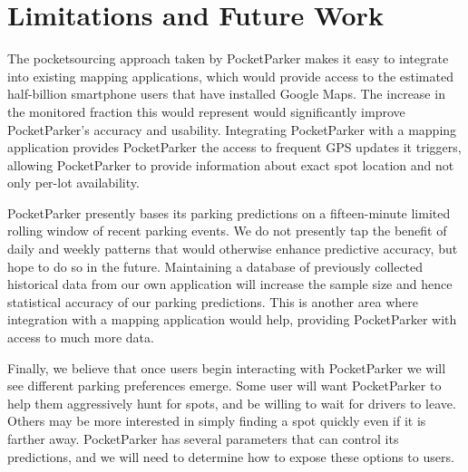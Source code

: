 \section{Limitations and Future Work}

The pocketsourcing approach taken by PocketParker makes it easy to integrate
into existing mapping applications, which would provide access to the
estimated half-billion smartphone users that have installed Google Maps. The
increase in the monitored fraction this would represent would significantly
improve PocketParker's accuracy and usability. Integrating PocketParker with a
mapping application provides PocketParker the access to frequent GPS updates
it triggers, allowing PocketParker to provide information about exact spot
location and not only per-lot availability.

PocketParker presently bases its parking predictions on a fifteen-minute
limited rolling window of recent parking events. We do not presently tap the
benefit of daily and weekly patterns that would otherwise enhance predictive
accuracy, but hope to do so in the future. Maintaining a database of
previously collected historical data from our own application will increase
the sample size and hence statistical accuracy of our parking predictions.
This is another area where integration with a mapping application would help,
providing PocketParker with access to much more data.

Finally, we believe that once users begin interacting with PocketParker we
will see different parking preferences emerge. Some user will want
PocketParker to help them aggressively hunt for spots, and be willing to wait
for drivers to leave. Others may be more interested in simply finding a spot
quickly even if it is farther away. PocketParker has several parameters that
can control its predictions, and we will need to determine how to expose
these options to users.

%
%
%
%
%
%
%
